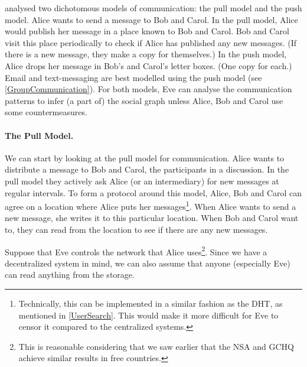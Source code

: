 \textcite{PPACinPubFS} analysed two dichotomous models of communication: the 
pull model and the push model.
Alice wants to send a message to Bob and Carol.
In the pull model, Alice would publish her message in a place known to Bob and 
Carol.
Bob and Carol visit this place periodically to check if Alice has published 
any new messages.
(If there is a new message, they make a copy for themselves.)
In the push model, Alice drops her message in Bob's and Carol's letter boxes.
(One copy for each.)
Email and text-messaging are best modelled using the push model (see 
\cref{GroupCommunication}).
For both models, Eve can analyse the communication patterns to infer (a part 
of) the social graph unless Alice, Bob and Carol use some countermeasures.


\paragraph{The Pull Model.}

We can start by looking at the pull model for communication.
Alice wants to distribute a message to Bob and Carol, the participants in 
a discussion.
In the pull model they actively ask Alice (or an intermediary) for new messages 
at regular intervals.
To form a protocol around this model, Alice, Bob and Carol can agree on 
a location where Alice puts her messages\footnote{%
  Technically, this can be implemented in a similar fashion as the \ac{DHT}, as 
  mentioned in \cref{UserSearch}.
  This would make it more difficult for Eve to censor it compared to the 
  centralized systems.
}.
When Alice wants to send a new message, she writes it to this particular 
location.
When Bob and Carol want to, they can read from the location to see if there are 
any new messages.

Suppose that Eve controls the network that Alice uses\footnote{%
  This is reasonable considering that we saw earlier that the \ac{NSA} and 
  \ac{GCHQ} achieve similar results in free countries.
}.
Since we have a decentralized system in mind, we can also assume that anyone 
(especially Eve) can read anything from the storage.

